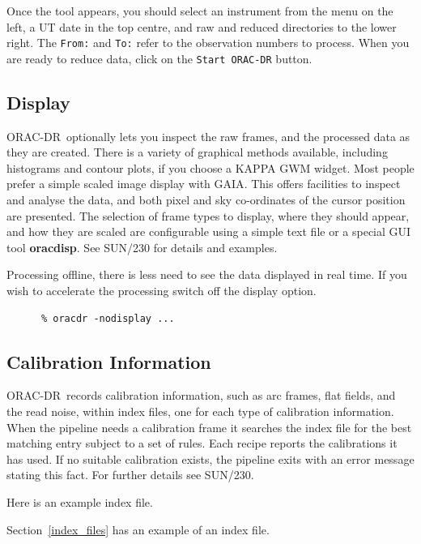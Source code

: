 \documentclass[twoside,11pt]{article}
\newcommand{\htmlref}[2]{#1}
\newenvironment{latexonly}{}{}
\newcommand{\xref}[3]{#1}
\newcommand{\xlabel}[1]{}
\renewcommand{\_}{\texttt{\symbol{95}}}
\newcommand{\GAIA}{{\footnotesize GAIA}}
\newcommand{\KAPPA}{{\footnotesize KAPPA}}
\newcommand{\ORACDR}{{\footnotesize ORAC-DR}}
\begin{document}
Once the tool appears, you should select an instrument from the menu on
the left, a UT date in the top centre, and raw and reduced directories
to the lower right.   The {\tt From:} and {\tt To:} refer to the
observation numbers to process.  When you are ready to reduce data,
click on the {\tt Start ORAC-DR} button.

\subsection{\xlabel{display}Display\label{display}}

\ORACDR\ optionally lets you inspect the raw frames, and the processed
data as they are created.  There is a variety of graphical
methods available, including histograms and contour plots, if you
choose a \xref{\KAPPA}{sun95}{} GWM widget.  Most people prefer a
simple scaled image display with \xref{\GAIA}{sun214}{}.  This offers
facilities to inspect and analyse the data, and both pixel and sky
co-ordinates of the cursor position are presented.  The selection of
frame types to display, where they should appear, and how they are
scaled are configurable using a simple text file or a special GUI tool
{\bf oracdisp}.  See \xref{SUN/230}{sun230}{display_system} for details
and examples.

Processing offline, there is less need to see the data displayed in real time.
If you wish to accelerate the processing switch off the display option.

\begin{verbatim}
      % oracdr -nodisplay ...
\end{verbatim}

\subsection{\xlabel{calibration_information}Calibration Information\label{calibration_information}}

\ORACDR\ records calibration information, such as arc frames, flat
fields, and the read noise, within index files, one for each type of
calibration information.  When the pipeline needs a calibration frame
it searches the index file for the best matching entry subject to a
set of rules. Each recipe reports the calibrations it has used.  If no
suitable calibration exists, the pipeline exits with an error message
stating this fact.  For further details see
\xref{SUN/230}{sun230}{calibration_selection}.
\begin{htmlonly}
Here is an
\htmlref{example index file.}{index_files}
\end{htmlonly}
\begin{latexonly}
Section~\ref{index_files} has an example of an index file.
\end{latexonly}
\end{document}
